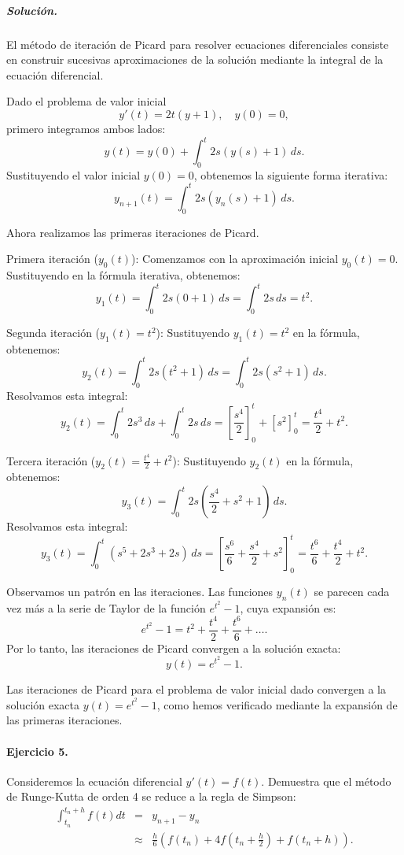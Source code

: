 \documentclass[12pt,letterpaper,oneside]{article}
\begin{document}
\subparagraph*{Solución.} El método de iteración de Picard para resolver ecuaciones diferenciales consiste en construir sucesivas aproximaciones de la solución mediante la integral de la ecuación diferencial.

Dado el problema de valor inicial
\[
y'(t) = 2t(y + 1), \quad y(0) = 0,
\]
primero integramos ambos lados:
\[
y(t) = y(0) + \int_0^t 2s(y(s) + 1)\,ds.
\]
Sustituyendo el valor inicial \(y(0) = 0\), obtenemos la siguiente forma iterativa:
\[
y_{n+1}(t) = \int_0^t 2s(y_n(s) + 1)\,ds.
\]

Ahora realizamos las primeras iteraciones de Picard.

Primera iteración (\(y_0(t)\)):
Comenzamos con la aproximación inicial \(y_0(t) = 0\). Sustituyendo en la fórmula iterativa, obtenemos:
\[
y_1(t) = \int_0^t 2s(0 + 1)\,ds = \int_0^t 2s\,ds = t^2.
\]

Segunda iteración (\(y_1(t) = t^2\)):
Sustituyendo \(y_1(t) = t^2\) en la fórmula, obtenemos:
\[
y_2(t) = \int_0^t 2s(t^2 + 1)\,ds = \int_0^t 2s(s^2 + 1)\,ds.
\]
Resolvamos esta integral:
\[
y_2(t) = \int_0^t 2s^3\,ds + \int_0^t 2s\,ds = \left[ \frac{s^4}{2} \right]_0^t + \left[ s^2 \right]_0^t = \frac{t^4}{2} + t^2.
\]

Tercera iteración (\(y_2(t) = \frac{t^4}{2} + t^2\)):
Sustituyendo \(y_2(t)\) en la fórmula, obtenemos:
\[
y_3(t) = \int_0^t 2s\left( \frac{s^4}{2} + s^2 + 1 \right)\,ds.
\]
Resolvamos esta integral:
\[
y_3(t) = \int_0^t \left( s^5 + 2s^3 + 2s \right)\,ds = \left[ \frac{s^6}{6} + \frac{s^4}{2} + s^2 \right]_0^t = \frac{t^6}{6} + \frac{t^4}{2} + t^2.
\]



Observamos un patrón en las iteraciones. Las funciones \(y_n(t)\) se parecen cada vez más a la serie de Taylor de la función \(e^{t^2} - 1\), cuya expansión es:
\[
e^{t^2} - 1 = t^2 + \frac{t^4}{2} + \frac{t^6}{6} + \dots.
\]
Por lo tanto, las iteraciones de Picard convergen a la solución exacta:
\[
y(t) = e^{t^2} - 1.
\]

Las iteraciones de Picard para el problema de valor inicial dado convergen a la solución exacta \(y(t) = e^{t^2} - 1\), como hemos verificado mediante la expansión de las primeras iteraciones.



\paragraph*{Ejercicio 5.} Consideremos la ecuación diferencial \( y'(t) = f(t) \). Demuestra que el método de Runge-Kutta de orden 4 se reduce a la regla de Simpson:
\[
\begin{array}{ccl}
\int_{t_n}^{t_n+h}f(t)dt &=& y_{n+1} - y_n \\
 &\approx & \frac{h}{6}\left(f\left(t_n \right) + 4f\left(t_n+\frac{h}{2}\right) + f\left(t_n+h\right)\right).
\end{array}
\]
\end{document}
